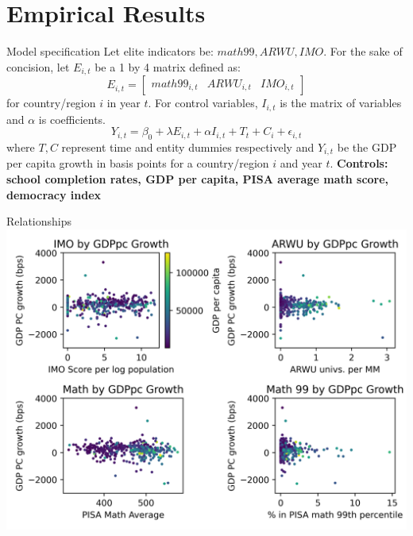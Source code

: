 \documentclass[10pt]{beamer}
\begin{document}
\section{Empirical Results}
\begin{frame}{Model specification}
    \small
    Let elite indicators be: $math99, ARWU, IMO$.
    For the sake of concision, let $E_{i,t}$ be a 1 by 4 matrix defined as:
    \[E_{i,t} = 
    \begin{bmatrix}
        math99_{i, t} & ARWU_{i, t} & IMO_{i, t}
    \end{bmatrix}
    \] for country/region $i$ in year $t$.
    For control variables, $I_{i, t}$ is the matrix of variables and $\alpha$ is coefficients.
    \begin{equation}
        Y_{i, t} = \beta_0 + \lambda E_{i, t} + \alpha I_{i, t} + T_t + C_i + \epsilon_{i, t}
    \end{equation}
    where $T,C$ represent time and entity dummies respectively and $Y_{i,t}$ be the GDP per capita growth in basis points for a country/region $i$ and year $t$.
    \textbf{Controls: school completion rates, GDP per capita, PISA average math score, democracy index}
\end{frame}

\begin{frame}{Relationships}
    \centering
    \includegraphics[width=\textwidth]{../charts/relationships.png}
\end{frame}
\end{document}
